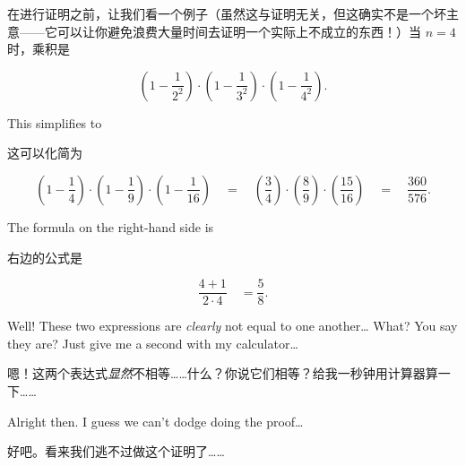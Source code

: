 在进行证明之前，让我们看一个例子（虽然这与证明无关，但这确实不是一个坏主意——它可以让你避免浪费大量时间去证明一个实际上不成立的东西！）当 $n = 4$ 时，乘积是

\[  \left(1-\frac{1}{2^2}\right) \cdot \left(1-\frac{1}{3^2}\right) \cdot \left(1-\frac{1}{4^2}\right).
\]

This simplifies to

这可以化简为

\[ \left( 1-\frac{1}{4} \right) \cdot \left( 1-\frac{1}{9} \right) \cdot 
\left( 1-\frac{1}{16} \right) \quad = \quad \left( \frac{3}{4} \right) \cdot \left( \frac{8}{9} \right) \cdot \left( \frac{15}{16} \right) \quad = \quad \frac{360}{576}.
\]

The formula on the right-hand side is 

右边的公式是

\[ \frac{4+1}{2 \cdot 4} \quad = \frac{5}{8}. \]

Well!
These two expressions are \emph{clearly} not equal to one another\ldots
What?  You say they are?
Just give me a second with my calculator\ldots

嗯！这两个表达式\emph{显然}不相等……什么？你说它们相等？给我一秒钟用计算器算一下……

Alright then.  I guess we can't dodge doing the proof\ldots

好吧。看来我们逃不过做这个证明了……

